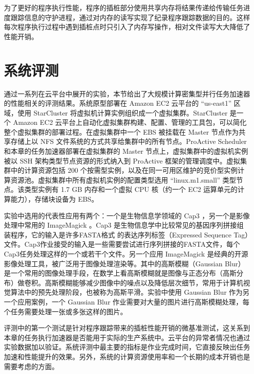 为了更好的程序执行性能，程序的插桩部分使用共享内存将结果传递给传输任务进度跟踪信息的守护进程，通过对内存的读写实现了纪录程序跟踪数据的目的。这样每次程序执行过程中遇到插桩点时只引入了内存写操作，相对文件读写大大降低了性能开销。

\section{系统评测}
\label{sec:no2_eval}
通过一系列在云平台中展开的实验，本节给出了大规模计算密集型并行任务加速器的性能相关的评测结果。系统原型部署在 Amazon EC2 云平台的 ``us-east1'' 区域，使用 StarCluster \cite{starcluster} 将虚拟机计算实例组织成一个虚拟集群。StarCluster \cite{starcluster} 是一个 Amazon EC2 云平台上自动化虚拟集群构建、配置、管理的工具包，可以简化整个虚拟集群的部署过程。在虚拟集群中一个 EBS 被挂载在 Master 节点作为共享存储上以 NFS 文件系统的方式共享给集群中的所有节点。ProActive Scheduler 和本章的任务加速器部署在虚拟集群的 Master 节点上，虚拟集群中的虚拟机实例被以 SSH 架构类型节点资源的形式纳入到 ProActive 框架的管理调度中。虚拟集群中的计算资源包括 200 个按需型实例，以及在同一可用区维护的竞价型实例计算资源池。虚拟集群中所有虚拟机实例的配置类型选用 ``linux.m1.small'' 类型节点。该类型实例有 1.7 GB 内存和一个虚拟 CPU 核（约一个 EC2 运算单元的计算能力），存储块设备为 EBS。

实验中选用的代表性应用有两个：一个是生物信息学领域的 Cap3 \cite{Huang:1999:Cap3}，另一个是影像处理中常用的 ImageMagick \cite{imagemagick}。Cap3 是生物信息学中比较常见的基因序列拼接组装程序，它的输入是许多FASTA格式 \cite{fasta} 的表达序列标签（Expressed Sequence Tag）文件。Cap3作业接受的输入是一些需要尝试进行序列拼接的FASTA文件，每个Cap3任务处理这样的一个或若干个文件。另一个应用 ImageMagick 是经典的开源影像处理工具，被广泛用于图像处理渲染等。其中的高斯模糊（Gaussian Blur）是一个常用的图像处理手段，在数学上看高斯模糊就是图像与正态分布（高斯分布）做卷积。高斯模糊能够减少图像中的噪点以及降低层次细节，常用于计算机视觉算法中的预先处理阶段，也被称为高斯平滑。实验中使用 Gaussian Blur 作为另一个应用案例，一个 Gaussian Blur 作业需要对大量的图片进行高斯模糊处理，每个任务需要处理一张或多张这样的图片。

评测中的第一个测试是针对程序跟踪带来的插桩性能开销的微基准测试，这关系到本章的任务执行加速器是否能用于实际的生产系统中。云平台的异常者情况也通过实验数据加以验证。系统评测中最主要的指标是作业完成时间，它直接反映出任务加速和性能提升的效果。另外，系统的计算资源使用率和一个长期的成本开销也是需要考虑的方面。

